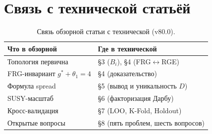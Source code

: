 \documentclass[11pt,a4paper]{article}
\theoremstyle{definition}
\begin{document}
\section{Связь с технической статьёй}
\label{app:technical-link}

\begin{table}[htbp]
\centering
\caption{Связь обзорной статьи с технической (v80.0).}
\label{tab:app-technical-link}
\begin{tabular}{p{4.5cm}p{8cm}}
\toprule
Что в обзорной & Где в технической \\
\midrule
Топология первична & §3 ($B_i$), §4 (FRG$\leftrightarrow$RGE) \\[0.3em]
FRG-инвариант $g^*+\theta_1 = 4$ & §4 (доказательство) \\[0.3em]
Формула spread & §5 (вывод и уникальность $D$) \\[0.3em]
SUSY-масштаб & §6 (факторизация Дарбу) \\[0.3em]
Кросс-валидация & §7 (LOO, K-Fold, Holdout) \\[0.3em]
Открытые вопросы & §8 (пять проблем, шесть вопросов) \\
\bottomrule
\end{tabular}
\end{table}

\end{document}
